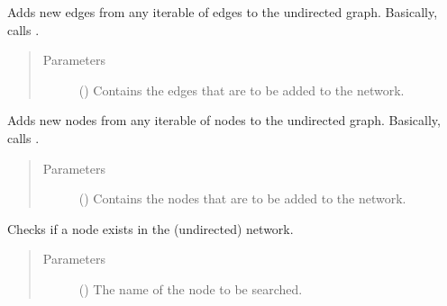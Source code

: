 \documentclass[letterpaper,10pt,english]{sphinxmanual}
\begin{document}
\begin{fulllineitems}
\begin{fulllineitems}
\begin{quote}
\begin{description}
\end{description}\end{quote}

\end{fulllineitems}


\begin{fulllineitems}
\label{\detokenize{main:pypath.main.PyPath.new_edges}}
Adds new edges from any iterable of edges to the undirected
graph. Basically, calls .
\begin{quote}\begin{description}
\item[{Parameters}] \leavevmode
{} () \textendash{} Contains the edges that are to be added to the network.

\end{description}\end{quote}

\end{fulllineitems}


\begin{fulllineitems}
\label{\detokenize{main:pypath.main.PyPath.new_nodes}}
Adds new nodes from any iterable of nodes to the undirected
graph. Basically, calls .
\begin{quote}\begin{description}
\item[{Parameters}] \leavevmode
{} () \textendash{} Contains the nodes that are to be added to the network.

\end{description}\end{quote}

\end{fulllineitems}


\begin{fulllineitems}
\label{\detokenize{main:pypath.main.PyPath.node_exists}}
Checks if a node exists in the (undirected) network.
\begin{quote}\begin{description}
\item[{Parameters}] \leavevmode
{} () \textendash{} The name of the node to be searched.


\end{description}
\end{quote}
\end{fulllineitems}
\end{fulllineitems}
\end{document}

